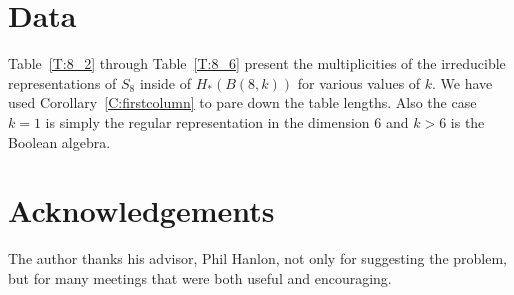 \documentclass{amsart}
\begin{document}

\section{Data} \label{S:data}
Table~\ref{T:8_2} through Table~\ref{T:8_6} present the multiplicities of the irreducible representations of $S_8$ inside of $H_*(B(8, k))$ for 
various values of $k$. We have used Corollary~\ref{C:firstcolumn} to pare down the table lengths. Also the case $k=1$ is
simply the regular representation in the dimension 6 and $k>6$ is the Boolean algebra.

\section{Acknowledgements}
The author thanks his advisor, Phil Hanlon, not only for suggesting the problem, but for many meetings that were both 
useful and encouraging.

\end{document}
